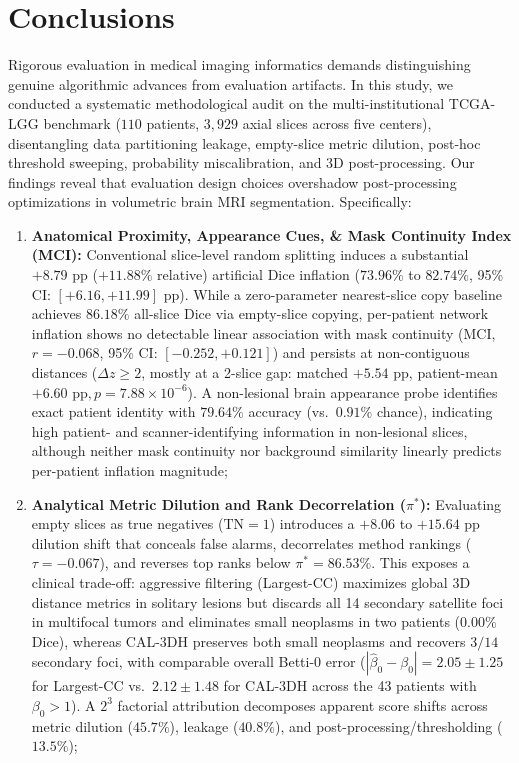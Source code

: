 \documentclass[11pt,a4paper]{article}
\begin{document}
\section{Conclusions}
\label{sec:conclusion}
Rigorous evaluation in medical imaging informatics demands distinguishing genuine algorithmic advances from evaluation artifacts. In this study, we conducted a systematic methodological audit on the multi-institutional TCGA-LGG benchmark ($110$ patients, $3,929$ axial slices across five centers), disentangling data partitioning leakage, empty-slice metric dilution, post-hoc threshold sweeping, probability miscalibration, and 3D post-processing. Our findings reveal that evaluation design choices overshadow post-processing optimizations in volumetric brain MRI segmentation. Specifically:
\begin{enumerate}\setlength{\itemsep}{0pt}\setlength{\parskip}{0pt}\setlength{\parsep}{0pt}
    \item \textbf{Anatomical Proximity, Appearance Cues, \& Mask Continuity Index (MCI):} Conventional slice-level random splitting induces a substantial $+8.79\text{ pp}$ ($+11.88\%$ relative) artificial Dice inflation ($73.96\%$ to $82.74\%$, 95\% CI: $[+6.16, +11.99]\text{ pp}$). While a zero-parameter nearest-slice copy baseline achieves $86.18\%$ all-slice Dice via empty-slice copying, per-patient network inflation shows no detectable linear association with mask continuity ($\text{MCI}$, $r = -0.068$, 95\% CI: $[-0.252, +0.121]$) and persists at non-contiguous distances ($\Delta z \ge 2$, mostly at a 2-slice gap: matched $+5.54\text{ pp}$, patient-mean $+6.60\text{ pp}, p = 7.88 \times 10^{-6}$). A non-lesional brain appearance probe identifies exact patient identity with $79.64\%$ accuracy (vs.\ $0.91\%$ chance), indicating high patient- and scanner-identifying information in non-lesional slices, although neither mask continuity nor background similarity linearly predicts per-patient inflation magnitude;
    \item \textbf{Analytical Metric Dilution and Rank Decorrelation ($\pi^*$):} Evaluating empty slices as true negatives ($\text{TN}=1$) introduces a $+8.06$ to $+15.64\text{ pp}$ dilution shift that conceals false alarms, decorrelates method rankings ($\tau = -0.067$), and reverses top ranks below $\pi^* = 86.53\%$. This exposes a clinical trade-off: aggressive filtering (Largest-CC) maximizes global 3D distance metrics in solitary lesions but discards all 14 secondary satellite foci in multifocal tumors and eliminates small neoplasms in two patients ($0.00\%$ Dice), whereas CAL-3DH preserves both small neoplasms and recovers $3/14$ secondary foci, with comparable overall Betti-0 error ($|\hat{\beta}_0 - \beta_0| = 2.05 \pm 1.25$ for Largest-CC vs.\ $2.12 \pm 1.48$ for CAL-3DH across the 43 patients with $\beta_0 > 1$). A $2^3$ factorial attribution decomposes apparent score shifts across metric dilution ($45.7\%$), leakage ($40.8\%$), and post-processing/thresholding ($13.5\%$);


\end{enumerate}
\end{document}
